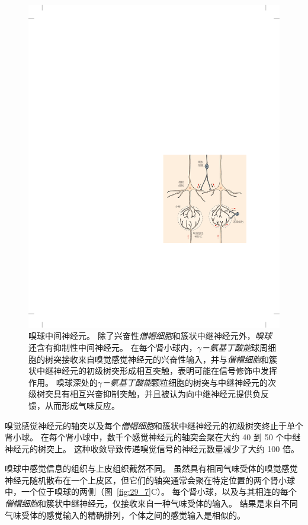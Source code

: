 \begin{figure}[htbp]
	\centering
	\includegraphics[width=0.5\linewidth]{chap29/fig_29_6}
	\caption{嗅球中间神经元。
		除了兴奋性\textit{僧帽细胞}和簇状中继神经元外，\textit{嗅球}还含有抑制性中间神经元。
		在每个肾小球内，\textit{$\gamma$－氨基丁酸能}球周细胞的树突接收来自嗅觉感觉神经元的兴奋性输入，并与\textit{僧帽细胞}和簇状中继神经元的初级树突形成相互突触，表明可能在信号修饰中发挥作用。
		嗅球深处的\textit{$\gamma$－氨基丁酸能}颗粒细胞的树突与中继神经元的次级树突具有相互兴奋抑制突触，并且被认为向中继神经元提供负反馈，从而形成气味反应\cite{haberly1998synaptic}。}
	\label{fig:29_6}
\end{figure}



嗅觉感觉神经元的轴突以及每个\textit{僧帽细胞}和簇状中继神经元的初级树突终止于单个肾小球。
在每个肾小球中，数千个感觉神经元的轴突会聚在大约 40 到 50 个中继神经元的树突上。
这种收敛导致传递嗅觉信号的神经元数量减少了大约 100 倍。


嗅球中感觉信息的组织与上皮组织截然不同。
虽然具有相同气味受体的嗅觉感觉神经元随机散布在一个上皮区，但它们的轴突通常会聚在特定位置的两个肾小球中，一个位于嗅球的两侧（图~\ref{fig:29_7}C）。
每个肾小球，以及与其相连的每个\textit{僧帽细胞}和簇状中继神经元，仅接收来自一种气味受体的输入。
结果是来自不同气味受体的感觉输入的精确排列，个体之间的感觉输入是相似的。


